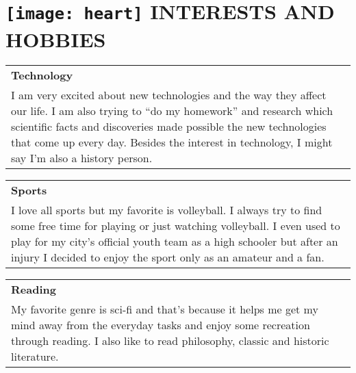 \documentclass[a4paper,10pt]{article}
\begin{document}
\section{\protect\texttt{[image: heart]} INTERESTS AND HOBBIES}

\begin{tabular}{|p{\linewidth}}
\textbf{Technology} \\
    \footnotesize{I am very excited about new technologies and the way they affect our life. I am also trying to “do my homework” and research which scientific facts and discoveries made possible the new technologies that come up every day. Besides the interest in technology, I might say I'm also a history person.} \\
\end{tabular}

\begin{tabular}{|p{\linewidth}}
\textbf{Sports} \\
    \footnotesize{I love all sports but my favorite is volleyball. I always try to find some free time for playing or just watching volleyball. I even used to play for my city’s official youth team as a high schooler but after an injury I decided to enjoy the sport only as an amateur and a fan.} \\
\end{tabular}

\begin{tabular}{|p{\linewidth}}
\textbf{Reading} \\
    \footnotesize{My favorite genre is sci-fi and that’s because it helps me get my mind away from the everyday tasks and enjoy some recreation through reading. I also like to read philosophy,  classic and historic literature.} \\
\end{tabular}
\end{document}
